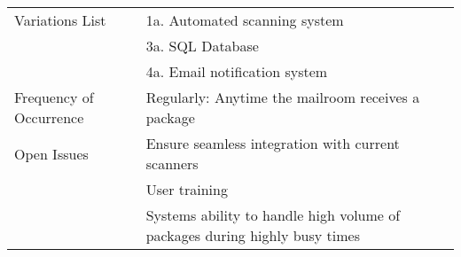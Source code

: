 \documentclass[11pt]{article}
\begin{document}
\begin{table}[tbp]
\begin{tabularx}{1.5\textwidth}{|X|X|}
\hline
Variations List & 1a. Automated scanning system \\
 & 3a. SQL Database \\
 & 4a. Email notification system \\
\hline
Frequency of Occurrence & Regularly: Anytime the mailroom receives a package \\
\hline
Open Issues & Ensure seamless integration with current scanners \\
 & User training \\
 & Systems ability to handle high volume of packages during highly busy times \\
\hline
\end{tabularx}
\end{table}
\end{document}
